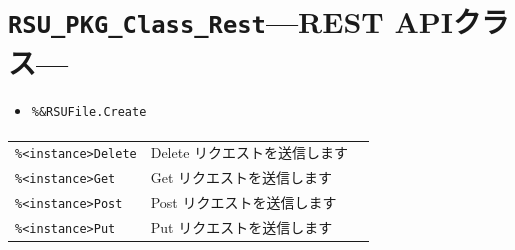 \section{\texttt{RSU\_PKG\_Class\_Rest}\;---\;REST APIクラス\;---}\label{sec:RSU_PKG_Class_Rest}
\paragraph{\DocStrTitleClassCreationFunction}
\begin{itemize}
\item\texttt{\%\&RSUFile.Create}
\end{itemize}
\paragraph{\DocStrTitleClassFunctionList}
\begin{center}
{\footnotesize
\begin{xltabular}{\textwidth}{|p{3.5truecm}|X|p{1.5truecm}|}
\hline
\thead{\DocStrHeaderFunctionName}&\thead{\DocStrDescription}&\thead{\DocStrRefto}\\
\hline
\hline
\texttt{\%<instance>Delete}&Delete リクエストを送信します&\\
\hline
\texttt{\%<instance>Get}&Get リクエストを送信します&\\
\hline
\texttt{\%<instance>Post}&Post リクエストを送信します&\\
\hline
\texttt{\%<instance>Put}&Put リクエストを送信します&\\
\hline
\end{xltabular}
}
\end{center}
